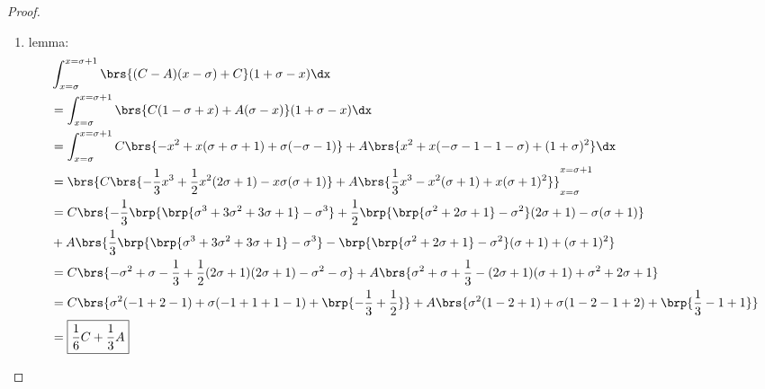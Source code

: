 \begin{proof}
\begin{enumerate}
  \item lemma: \label{ilem:stromberg_CA}
    \begin{align*}
        &\int_{x=\sigma}^{x=\sigma+1}   \brs{ (C-A)(x-\sigma)+C           } (1+\sigma-x)    \dx
    \\&= \int_{x=\sigma}^{x=\sigma+1}   \brs{ C(1-\sigma+x) + A(\sigma-x) } (1+\sigma-x)    \dx
    \\&= \int_{x=\sigma}^{x=\sigma+1}  C\brs{-x^2 +  x(\sigma+\sigma+1) + \sigma(-\sigma-1)    }
                                     + A\brs{ x^2 +  x(-\sigma-1-1-\sigma) + (1+\sigma)^2} \dx
    \\&= \brs{ C\brs{-\frac{1}{3}x^3 + \frac{1}{2} x^2(2\sigma+1) - x\sigma(\sigma+1)}
              +A\brs{ \frac{1}{3}x^3 -             x^2( \sigma+1) + x(\sigma+1)^2    }
             }_{x=\sigma}^{x=\sigma+1}
    \\&= C\brs{-\frac{1}{3}\brp{\brp{\sigma^3+3\sigma^2+3\sigma+1}-\sigma^3} + \frac{1}{2}\brp{\brp{\sigma^2+2\sigma+1}-\sigma^2}(2\sigma+1) - \sigma(\sigma+1) }
    \\&+ A\brs{ \frac{1}{3}\brp{\brp{\sigma^3+3\sigma^2+3\sigma+1}-\sigma^3} -            \brp{\brp{\sigma^2+2\sigma+1}-\sigma^2}( \sigma+1) + (\sigma+1)^2     }
    \\&= C\brs{-\sigma^2 + \sigma - \frac{1}{3} + \frac{1}{2}(2\sigma+1)(2\sigma+1) - \sigma^2 -\sigma }
       + A\brs{ \sigma^2 + \sigma + \frac{1}{3} - (2\sigma+1)( \sigma+1) + \sigma^2 + 2\sigma + 1      }
    \\&= C\brs{\sigma^2(-1+2-1) + \sigma(-1+1+1-1) + \brp{-\frac{1}{3}+\frac{1}{2}}}
       + A\brs{\sigma^2( 1-2+1) + \sigma( 1-2-1+2) + \brp{ \frac{1}{3}-1+1}}
    \\&= \boxed{\frac{1}{6}C + \frac{1}{3}A}
    \end{align*}


\end{enumerate}
\end{proof}
